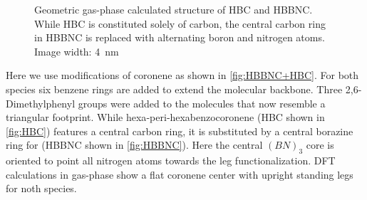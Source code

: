 \begin{figure}[ht]\centering
	 \quad
	\caption{Geometric gas-phase calculated structure of  HBC and  HBBNC. While HBC is constituted solely of carbon, the central carbon ring in HBBNC is replaced with alternating boron and nitrogen atoms. Image width: \SI{4}{\nano \meter}}
	\label{fig:HBBNC+HBC}
\end{figure}


Here we use modifications of coronene as shown in \autoref{fig:HBBNC+HBC}. For both species six benzene rings are added to extend the molecular backbone. Three 2,6-Dimethylphenyl groups were added to the molecules that now resemble a triangular footprint. While hexa‐peri‐hexabenzocoronene (HBC shown in \autoref{fig:HBC}) features a central carbon ring, it is substituted by a central borazine ring for (HBBNC shown in \autoref{fig:HBBNC}). Here the central $(BN)_3$ core is oriented to point all nitrogen atoms towards the leg functionalization. DFT calculations in gas-phase show a flat coronene center with upright standing legs for noth species.

